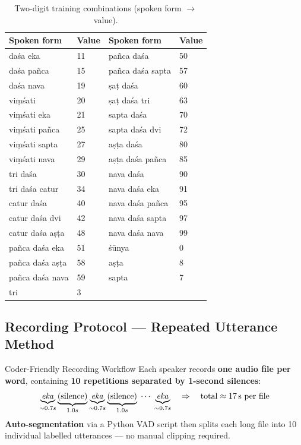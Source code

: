 \documentclass[12pt,a4paper]{article}
\begin{document}
\begin{table}[h!]
\centering
\caption{Two-digit training combinations (spoken form $\to$ value).}
\label{tab:combos}
\begin{tabular}{@{}llll@{}}
\toprule
\textbf{Spoken form} & \textbf{Value} &
\textbf{Spoken form} & \textbf{Value} \\
\midrule
da\'{s}a eka              & 11 & pa\~{n}ca da\'{s}a      & 50 \\
da\'{s}a pa\~{n}ca        & 15 & pa\~{n}ca da\'{s}a sapta & 57 \\
da\'{s}a nava             & 19 & \d{s}a\d{t} da\'{s}a    & 60 \\
vi\d{m}\'{s}ati           & 20 & \d{s}a\d{t} da\'{s}a tri & 63 \\
vi\d{m}\'{s}ati eka       & 21 & sapta da\'{s}a          & 70 \\
vi\d{m}\'{s}ati pa\~{n}ca & 25 & sapta da\'{s}a dvi      & 72 \\
vi\d{m}\'{s}ati sapta     & 27 & a\d{s}\d{t}a da\'{s}a   & 80 \\
vi\d{m}\'{s}ati nava      & 29 & a\d{s}\d{t}a da\'{s}a pa\~{n}ca & 85 \\
tri da\'{s}a              & 30 & nava da\'{s}a           & 90 \\
tri da\'{s}a catur        & 34 & nava da\'{s}a eka       & 91 \\
catur da\'{s}a            & 40 & nava da\'{s}a pa\~{n}ca & 95 \\
catur da\'{s}a dvi        & 42 & nava da\'{s}a sapta     & 97 \\
catur da\'{s}a a\d{s}\d{t}a & 48 & nava da\'{s}a nava   & 99 \\
pa\~{n}ca da\'{s}a eka    & 51 & \'{s}\={u}nya          & 0  \\
pa\~{n}ca da\'{s}a a\d{s}\d{t}a & 58 & a\d{s}\d{t}a   & 8  \\
pa\~{n}ca da\'{s}a nava   & 59 & sapta                  & 7  \\
tri                       & 3  & & \\
\bottomrule
\end{tabular}
\end{table}

\subsection{Recording Protocol --- Repeated Utterance Method}

\begin{keybox}{Coder-Friendly Recording Workflow}
Each speaker records \textbf{one audio file per word}, containing
\textbf{10 repetitions separated by 1-second silences}:
\[
  \underbrace{\text{\textit{eka}}}_{\sim0.7s}
  \underbrace{\text{(silence)}}_{1.0s}
  \underbrace{\text{\textit{eka}}}_{\sim0.7s}
  \underbrace{\text{(silence)}}_{1.0s}
  \;\cdots\;
  \underbrace{\text{\textit{eka}}}_{\sim0.7s}
  \quad \Rightarrow \quad \text{total} \approx 17\,\text{s per file}
\]
\textbf{Auto-segmentation} via a Python VAD script then splits each long file
into 10 individual labelled utterances --- no manual clipping required.
\end{keybox}
\end{document}
